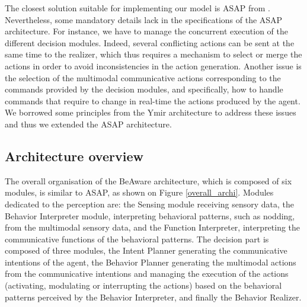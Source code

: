 The closest solution suitable for implementing our model is ASAP from \cite{kopp_architecture_2014}.
Nevertheless, some mandatory details lack in the specifications of the ASAP architecture. For instance, we have to manage the concurrent execution of the different decision modules. Indeed, several conflicting actions can be sent at the same time to the realizer, which thus requires a mechanism to select or merge the actions in order to avoid inconsistencies in the action generation. Another issue is the selection of the multimodal communicative actions corresponding to the commands provided by the decision modules, and specifically, how to handle commands that require to change in real-time the actions produced by the agent. 
We borrowed some principles from the Ymir architecture \cite{thorisson_mind_1999} to address these issues and thus we extended the ASAP architecture.  

\subsection{Architecture overview}

The overall organisation of the BeAware architecture, which is composed of six modules, is similar to ASAP, as shown on Figure \ref{overall_archi}. 
Modules dedicated to the perception are: 
the Sensing module receiving sensory data, 
the Behavior Interpreter module, interpreting behavioral patterns, such as nodding, from the multimodal sensory data, 
and the Function Interpreter, interpreting the communicative functions of the behavioral patterns. 
The decision part is composed of three modules, 
the Intent Planner generating the communicative intentions of the agent, 
the Behavior Planner generating the multimodal actions from the communicative intentions and managing the execution of the actions (activating, modulating or interrupting the actions) based on the behavioral patterns perceived by the Behavior Interpreter,
and finally the Behavior Realizer. 

